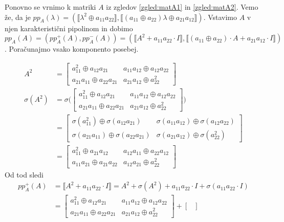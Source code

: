 \documentclass[mat1]{fmfdelo}
\begin{document}
\begin{zgled}\label{zgled:matA3}
	Ponovno se vrnimo k matriki $A$ iz zgledov \ref{zgled:matA1} in \ref{zgled:matA2}. Vemo že, da je $pp_A(\lambda) = (\llbracket\lambda^2 \oplus a_{11}a_{22}\rrbracket,\llbracket (a_{11} \oplus a_{22})\lambda \oplus a_{21}a_{12}\rrbracket)$. Vstavimo $A$ v njen karakteristični pipolinom in dobimo $pp_A(A) = (pp_A^{+}(A), pp_A^{-}(A)) = (\llbracket A^2 + a_{11}a_{22}\cdot I\rrbracket,\llbracket (a_{11} \oplus a_{22})\cdot A + a_{21}a_{12}\cdot I\rrbracket)$. Poračunajmo vsako komponento posebej.
	
	\begin{align*}
		A^2 &= \begin{bmatrix}
			a_{11}^2 \oplus a_{12}a_{21} & a_{11}a_{12} \oplus a_{12}a_{22} \\
			a_{21}a_{11} \oplus a_{22}a_{21} & a_{21}a_{12} \oplus a_{22}^2
		\end{bmatrix} \\
		\sigma(A^2) &= \sigma\bigg(\begin{bmatrix}
			a_{11}^2 \oplus a_{12}a_{21} & a_{11}a_{12} \oplus a_{12}a_{22} \\
			a_{21}a_{11} \oplus a_{22}a_{21} & a_{21}a_{12} \oplus a_{22}^2
		\end{bmatrix}\bigg) \\
	&= \begin{bmatrix}
		\sigma(a_{11}^2) \oplus \sigma(a_{12}a_{21}) & \sigma(a_{11}a_{12}) \oplus \sigma(a_{12}a_{22}) \\
		\sigma(a_{21}a_{11}) \oplus \sigma(a_{22}a_{21}) & \sigma(a_{21}a_{12}) \oplus \sigma(a_{22}^2)
	\end{bmatrix} \\
&= \begin{bmatrix}
	a_{11}^2 \oplus a_{21}a_{12} & a_{12}a_{11} \oplus a_{22}a_{12} \\
	a_{11}a_{21} \oplus a_{21}a_{22} & a_{12}a_{21} \oplus a_{22}^2
\end{bmatrix}
	\end{align*}
Od tod sledi \begin{align*}
pp_A^{+}(A) &= \llbracket A^2 + a_{11}a_{22}\cdot I \rrbracket = A^2 + \sigma(A^2) + a_{11}a_{22}\cdot I + \sigma(a_{11}a_{22}\cdot I) \\ 
&= \begin{bmatrix}
	a_{11}^2 \oplus a_{12}a_{21} & a_{11}a_{12} \oplus a_{12}a_{22} \\
	a_{21}a_{11} \oplus a_{22}a_{21} & a_{21}a_{12} \oplus a_{22}^2
\end{bmatrix} + \begin{bmatrix}

\end{bmatrix}
\end{align*}
\end{zgled}
\end{document}
